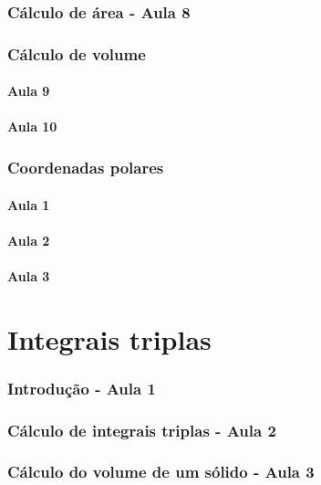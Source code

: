 \documentclass[12pt, a4paper]{article}
\begin{document}
		\section{Cálculo de área - Aula 8}
					
		\section{Cálculo de volume}
			\subsection{Aula 9}
						
			\subsection{Aula 10}
					
		\section{Coordenadas polares}		
			\subsection{Aula 1}
							
			\subsection{Aula 2}
							
			\subsection{Aula 3}
							
	\part{Integrais triplas}	
		\section{Introdução - Aula 1}
					
		\section{Cálculo de integrais triplas - Aula 2}
					
		\section{Cálculo do volume de um sólido - Aula 3}
					
\end{document}
